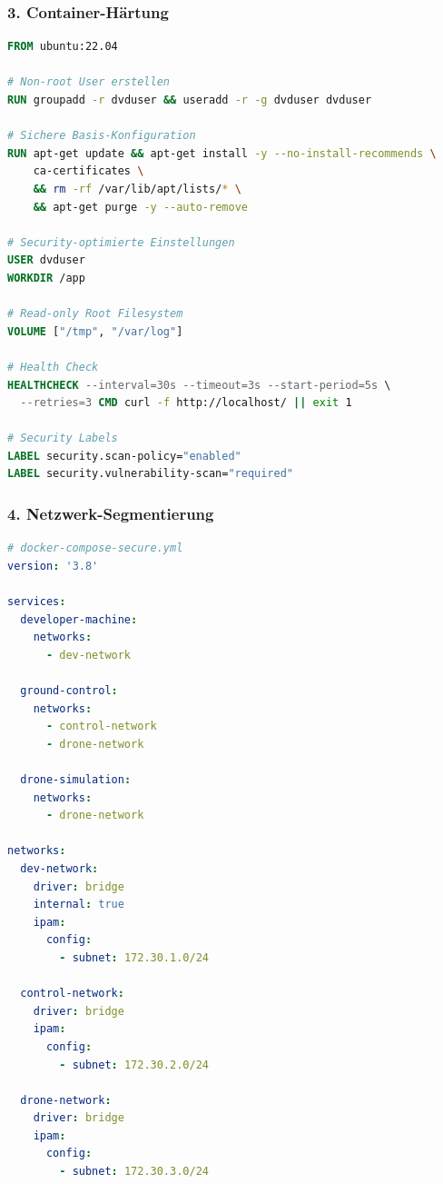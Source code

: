 \documentclass[11pt,a4paper]{article}
\begin{document}
\subsubsection{3. Container-Härtung}

\begin{lstlisting}[language=dockerfile, caption=Gehärteter Container]
FROM ubuntu:22.04

# Non-root User erstellen
RUN groupadd -r dvduser && useradd -r -g dvduser dvduser

# Sichere Basis-Konfiguration
RUN apt-get update && apt-get install -y --no-install-recommends \
    ca-certificates \
    && rm -rf /var/lib/apt/lists/* \
    && apt-get purge -y --auto-remove

# Security-optimierte Einstellungen
USER dvduser
WORKDIR /app

# Read-only Root Filesystem
VOLUME ["/tmp", "/var/log"]

# Health Check
HEALTHCHECK --interval=30s --timeout=3s --start-period=5s \
  --retries=3 CMD curl -f http://localhost/ || exit 1

# Security Labels
LABEL security.scan-policy="enabled"
LABEL security.vulnerability-scan="required"
\end{lstlisting}

\subsubsection{4. Netzwerk-Segmentierung}

\begin{lstlisting}[language=yaml, caption=Mikro-Segmentierung mit Docker Networks]
# docker-compose-secure.yml
version: '3.8'

services:
  developer-machine:
    networks:
      - dev-network
    
  ground-control:
    networks:
      - control-network
      - drone-network
    
  drone-simulation:
    networks:
      - drone-network

networks:
  dev-network:
    driver: bridge
    internal: true
    ipam:
      config:
        - subnet: 172.30.1.0/24
  
  control-network:
    driver: bridge
    ipam:
      config:
        - subnet: 172.30.2.0/24
        
  drone-network:
    driver: bridge
    ipam:
      config:
        - subnet: 172.30.3.0/24
\end{lstlisting}
\end{document}
